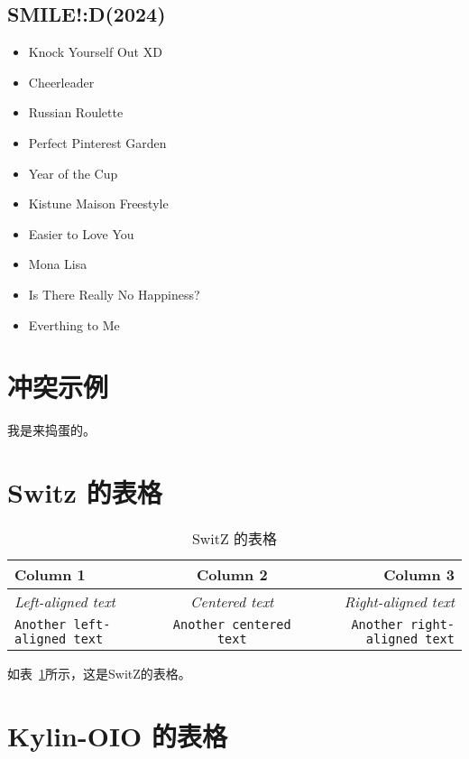 \documentclass{article}
\begin{document}
\subsection{SMILE!:D(2024)}
\begin{itemize}
    \item Knock Yourself Out XD
    \item Cheerleader
    \item Russian Roulette
    \item Perfect Pinterest Garden
    \item Year of the Cup
    \item Kistune Maison Freestyle
    \item Easier to Love You
    \item Mona Lisa
    \item Is There Really No Happiness?
    \item Everthing to Me
\end{itemize}

    \section{冲突示例}

    我是来捣蛋的。

    \section{ Switz 的表格}
    \begin{table}[h]
        \centering
        \begin{tabular}{lcr}
            \toprule
            \textbf{Column 1} & \textbf{Column 2} & \textbf{Column 3} \\
            \midrule
            \textit{Left-aligned text} & \textit{Centered text} & \textit{Right-aligned text} \\
            \texttt{Another left-aligned text} & \texttt{Another centered text} & \texttt{Another right-aligned text} \\
            \bottomrule
        \end{tabular}
        \caption{SwitZ 的表格}
        \label{tab:switz}
    \end{table}
    如表~\ref{tab:switz}所示，这是SwitZ的表格。
    \section{ Kylin-OIO 的表格}
\end{document}
